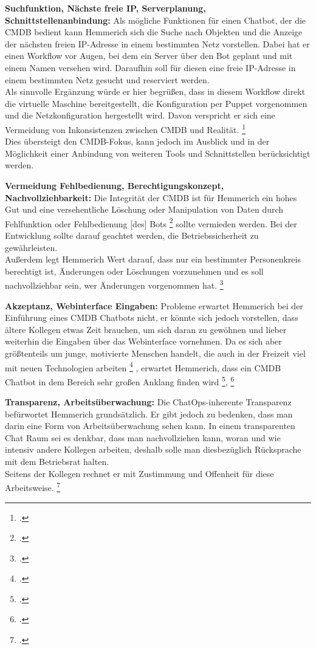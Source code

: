\textbf{Suchfunktion, Nächste freie IP, Serverplanung, Schnittstellenanbindung: }Als mögliche Funktionen für einen Chatbot, der die \acs{CMDB} bedient kann Hemmerich sich die Suche nach Objekten und die Anzeige der nächsten freien IP-Adresse in einem bestimmten Netz vorstellen.
Dabei hat er einen Workflow vor Augen, bei dem ein Server über den Bot geplant und mit einem Namen versehen wird. Daraufhin soll für diesen eine freie IP-Adresse in einem bestimmten Netz gesucht und reserviert werden.\\
Als sinnvolle Ergänzung würde er hier begrüßen, dass in diesem Workflow direkt die virtuelle Maschine bereitgestellt, die Konfiguration per Puppet vorgenommen und die Netzkonfiguration hergestellt wird. Davon verspricht er sich eine Vermeidung von Inkonsistenzen zwischen CMDB und Realität. 
\footcite[Vgl.][o. \pno]{Hemm_2019}\\
Dies übersteigt den \acs{CMDB}-Fokus, kann jedoch im Ausblick und in der Möglichkeit einer Anbindung von weiteren Tools und Schnittstellen berücksichtigt werden.

\textbf{Vermeidung Fehlbedienung, Berechtigungskonzept, Nachvollziehbarkeit: }Die Integrität der \acs{CMDB} ist für Hemmerich ein hohes Gut und eine versehentliche Löschung oder Manipulation von Daten durch \glqq{}Fehlfunktion oder Fehlbedienung [des] Bots\grqq
\footcite[][o. \pno]{Hemm_2019}
sollte vermieden werden. Bei der Entwicklung sollte darauf geachtet werden, die Betriebssicherheit zu gewährleisten.\\
Außerdem legt Hemmerich Wert darauf, dass nur ein bestimmter Personenkreis berechtigt ist, Änderungen oder Löschungen vorzunehmen und es soll nachvollziehbar sein, wer Änderungen vorgenommen hat.
\footcite[Vgl.][o. \pno]{Hemm_2019}

\textbf{Akzeptanz, Webinterface Eingaben: }Probleme erwartet Hemmerich bei der Einführung eines \acs{CMDB} Chatbots nicht, er könnte sich jedoch vorstellen, dass ältere Kollegen etwas Zeit brauchen, um sich daran zu gewöhnen und lieber weiterhin die Eingaben über das Webinterface vornehmen. 
Da es sich aber größtenteils um junge, motivierte Menschen handelt, \glqq{}die auch in der Freizeit viel mit neuen Technologien arbeiten\grqq
\footcite[][o. \pno]{Hemm_2019}
, erwartet Hemmerich, dass ein \acs{CMDB} Chatbot \glqq{}in dem Bereich sehr großen Anklang finden wird\grqq
\footcite[][o. \pno]{Hemm_2019},
\footcite[Vgl.][o. \pno]{Hemm_2019}

\textbf{Transparenz, Arbeitsüberwachung: }Die ChatOps-inherente Transparenz befürwortet Hemmerich grundsätzlich. Er gibt jedoch zu bedenken, dass man darin eine Form von Arbeitsüberwachung sehen kann. In einem transparenten Chat Raum sei es denkbar, dass man nachvollziehen kann, woran und wie intensiv andere Kollegen arbeiten, deshalb solle man diesbezüglich Rücksprache mit dem Betriebsrat halten.\\
Seitens der Kollegen rechnet er mit Zustimmung und Offenheit für diese Arbeitsweise. 
\footcite[Vgl.][o. \pno]{Hemm_2019}

